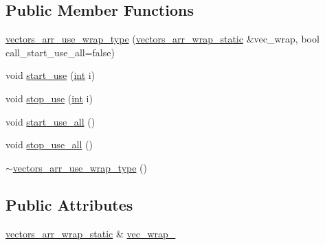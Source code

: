 \subsection*{Public Member Functions}
\begin{DoxyCompactItemize}
\item 
\hyperlink{structnumerical__algos_1_1detail_1_1vectors__arr__wrap__static_1_1vectors__arr__use__wrap__type_ae05fa3796de83f0077404718ee4418cd}{vectors\-\_\-arr\-\_\-use\-\_\-wrap\-\_\-type} (\hyperlink{structnumerical__algos_1_1detail_1_1vectors__arr__wrap__static}{vectors\-\_\-arr\-\_\-wrap\-\_\-static} \&vec\-\_\-wrap, bool call\-\_\-start\-\_\-use\-\_\-all=false)
\item 
void \hyperlink{structnumerical__algos_1_1detail_1_1vectors__arr__wrap__static_1_1vectors__arr__use__wrap__type_a4110dbc8ab1611710d403d691b6f922e}{start\-\_\-use} (\hyperlink{classint}{int} i)
\item 
void \hyperlink{structnumerical__algos_1_1detail_1_1vectors__arr__wrap__static_1_1vectors__arr__use__wrap__type_a58a5bc56563d84c230e584322ad4fcf9}{stop\-\_\-use} (\hyperlink{classint}{int} i)
\item 
void \hyperlink{structnumerical__algos_1_1detail_1_1vectors__arr__wrap__static_1_1vectors__arr__use__wrap__type_aa647a431e3a24653ab9a3c831473ebda}{start\-\_\-use\-\_\-all} ()
\item 
void \hyperlink{structnumerical__algos_1_1detail_1_1vectors__arr__wrap__static_1_1vectors__arr__use__wrap__type_adf139335704400b0a9ff32aa473ba64f}{stop\-\_\-use\-\_\-all} ()
\item 
\hyperlink{structnumerical__algos_1_1detail_1_1vectors__arr__wrap__static_1_1vectors__arr__use__wrap__type_aafb82cac0903883ba02f25e5e6cbcba2}{$\sim$vectors\-\_\-arr\-\_\-use\-\_\-wrap\-\_\-type} ()
\end{DoxyCompactItemize}
\subsection*{Public Attributes}
\begin{DoxyCompactItemize}
\item 
\hyperlink{structnumerical__algos_1_1detail_1_1vectors__arr__wrap__static}{vectors\-\_\-arr\-\_\-wrap\-\_\-static} \& \hyperlink{structnumerical__algos_1_1detail_1_1vectors__arr__wrap__static_1_1vectors__arr__use__wrap__type_a534c2d7668748a1bd34cba7bfb179975}{vec\-\_\-wrap\-\_\-}
\end{DoxyCompactItemize}


